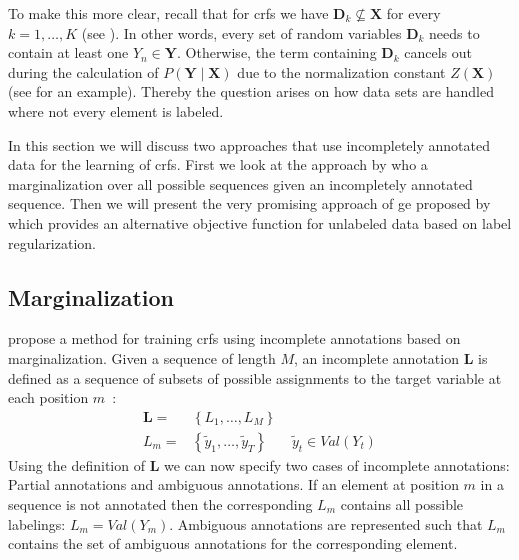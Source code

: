 To make this more clear, recall that for \glspl{crf} we have $\bm{D}_k\not\subseteq\bm{X}$ for every $k=1,\dots,K$ (see ).
In other words, every set of \glspl{random variable} $\bm{D}_k$ needs to contain at least one $Y_n\in\bm{Y}$.
Otherwise, the term containing $\bm{D}_k$ cancels out during the calculation of $P(\bm{Y}\mid\bm{X})$ due to the normalization constant $Z(\bm{X})$ (see  for an example).
Thereby the question arises on how data sets are handled where not every element is labeled.

In this section we will discuss two approaches that use incompletely annotated data for the learning of \glspl{crf}.
First we look at the approach by \citet{tsuboi2008training} who a marginalization over all possible sequences given an incompletely annotated sequence.
Then we will present the very promising approach of \acrfull{ge} proposed by \citet{mann2007simple} which provides an alternative \gls{objective function} for unlabeled data based on \gls{label regularization}.

\subsection{Marginalization}

\citet{tsuboi2008training} propose a method for training \glspl{crf} using incomplete annotations based on marginalization.
Given a sequence of length $M$, an incomplete annotation $\bm{L}$ is defined as a sequence of subsets of possible assignments to the \gls{target variable} at each position $m$~\citep{tsuboi2008training}:
\begin{equation}
  \label{equ:incomplete-annotation}
  \begin{split}
  \bm{L}=& \left\{L_1,\dots,L_M\right\}\\
  L_m=& \left\{\tilde{y}_1,\dots,\tilde{y}_T\right\}\ \ \ \ \ \ \ \ \tilde{y}_t\in Val(Y_t)
  \end{split}
\end{equation}
Using the definition of $\bm{L}$ we can now specify two cases of incomplete annotations: Partial annotations and ambiguous annotations.
If an element at position $m$ in a sequence is not annotated then the corresponding $L_m$ contains all possible labelings: $L_m=Val(Y_m)$.
Ambiguous annotations are represented such that $L_m$ contains the set of ambiguous annotations for the corresponding element.

\bigskip

